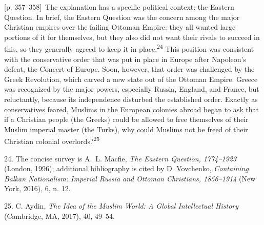 \documentclass[10pt,a4paper]{article}
\begin{document}
{\scriptsize\color{gray}[p. 357–358]}\ The explanation has a specific political context: the Eastern Question. In brief, the Eastern Question was the concern among the major Christian empires over the failing Ottoman Empire: they all wanted large portions of it for themselves, but they also did not want their rivals to succeed in this, so they generally agreed to keep it in place.\nobreak\textsuperscript{24} This position was consistent with the conservative order that was put in place in Europe after Napoleon’s defeat, the Concert of Europe. Soon, however, that order was challenged by the Greek Revolution, which carved a new state out of the Ottoman Empire. Greece was recognized by the major powers, especially Russia, England, and France, but reluctantly, because its independence disturbed the established order. Exactly as conservatives feared, Muslims in the European colonies abroad began to ask that if a Christian people (the Greeks) could be allowed to free themselves of their Muslim imperial master (the Turks), why could Muslims not be freed of their Christian colonial overlords?\nobreak\textsuperscript{25}\par{\small 24. The concise survey is A. L. Macfie, \textit{The Eastern Question, 1774–1923} (London, 1996); additional bibliography is cited by D. Vovchenko, \textit{Containing Balkan Nationalism: Imperial Russia and Ottoman Christians, 1856–1914 }(New York, 2016), 6, n. 12.\par}{\small 25. C. Aydin, \textit{The Idea of the Muslim World: A Global Intellectual History} (Cambridge, MA, 2017), 40, 49–54.\par}
\end{document}
